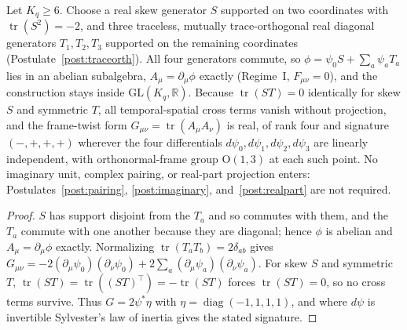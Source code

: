 \begin{proposition}\label{prop:4d_signature}
Let $K_q \geq 6$. Choose a real skew generator $S$ supported on two coordinates with $\operatorname{tr}(S^2) = -2$, and three traceless, mutually trace-orthogonal real diagonal generators $T_1, T_2, T_3$ supported on the remaining coordinates (Postulate~\ref{post:traceorth}). All four generators commute, so $\phi = \psi_0 S + \sum_a \psi_a T_a$ lies in an abelian subalgebra, $A_\mu = \partial_\mu\phi$ exactly (Regime~I, $F_{\mu\nu} = 0$), and the construction stays inside $\mathrm{GL}(K_q,\mathbb{R})$. Because $\operatorname{tr}(ST) = 0$ identically for skew $S$ and symmetric $T$, all temporal-spatial cross terms vanish without projection, and the frame-twist form $G_{\mu\nu} = \operatorname{tr}(A_\mu A_\nu)$ is real, of rank four and signature $(-,+,+,+)$ wherever the four differentials $d\psi_0, d\psi_1, d\psi_2, d\psi_3$ are linearly independent, with orthonormal-frame group $\mathrm{O}(1,3)$ at each such point. No imaginary unit, complex pairing, or real-part projection enters: Postulates~\ref{post:pairing}, \ref{post:imaginary}, and~\ref{post:realpart} are not required.
\end{proposition}
\begin{proof}
$S$ has support disjoint from the $T_a$ and so commutes with them, and the $T_a$ commute with one another because they are diagonal; hence $\phi$ is abelian and $A_\mu = \partial_\mu\phi$ exactly. Normalizing $\operatorname{tr}(T_a T_b) = 2\delta_{ab}$ gives $G_{\mu\nu} = -2(\partial_\mu\psi_0)(\partial_\nu\psi_0) + 2\sum_a (\partial_\mu\psi_a)(\partial_\nu\psi_a)$. For skew $S$ and symmetric $T$, $\operatorname{tr}(ST) = \operatorname{tr}((ST)^\top) = -\operatorname{tr}(ST)$ forces $\operatorname{tr}(ST) = 0$, so no cross terms survive. Thus $G = 2\psi^*\eta$ with $\eta = \operatorname{diag}(-1,1,1,1)$, and where $d\psi$ is invertible Sylvester's law of inertia gives the stated signature.
\end{proof}

